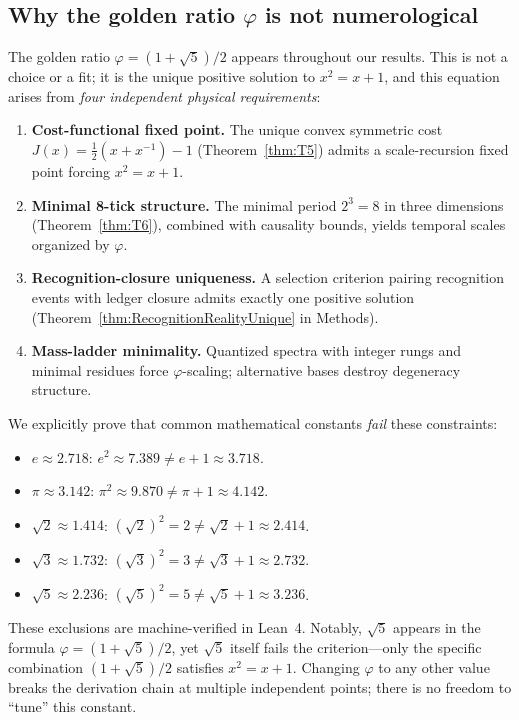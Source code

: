\documentclass[11pt]{article}
\begin{document}
\subsection*{Why the golden ratio $\varphi$ is not numerological}

The golden ratio $\varphi=(1+\sqrt{5})/2$ appears throughout our results. This is not a choice or a fit; it is the unique positive solution to $x^2=x+1$, and this equation arises from \emph{four independent physical requirements}:
\begin{enumerate}
\item \textbf{Cost-functional fixed point.} The unique convex symmetric cost $J(x)=\tfrac{1}{2}(x+x^{-1})-1$ (Theorem~\ref{thm:T5}) admits a scale-recursion fixed point forcing $x^2=x+1$.
\item \textbf{Minimal 8-tick structure.} The minimal period $2^3=8$ in three dimensions (Theorem~\ref{thm:T6}), combined with causality bounds, yields temporal scales organized by $\varphi$.
\item \textbf{Recognition-closure uniqueness.} A selection criterion pairing recognition events with ledger closure admits exactly one positive solution (Theorem~\ref{thm:RecognitionRealityUnique} in Methods).
\item \textbf{Mass-ladder minimality.} Quantized spectra with integer rungs and minimal residues force $\varphi$-scaling; alternative bases destroy degeneracy structure.
\end{enumerate}
We explicitly prove that common mathematical constants \emph{fail} these constraints:
\begin{itemize}
\item $e\approx 2.718$: $e^2\approx 7.389 \ne e+1\approx 3.718$.
\item $\pi\approx 3.142$: $\pi^2\approx 9.870 \ne \pi+1\approx 4.142$.
\item $\sqrt{2}\approx 1.414$: $(\sqrt{2})^2=2 \ne \sqrt{2}+1\approx 2.414$.
\item $\sqrt{3}\approx 1.732$: $(\sqrt{3})^2=3 \ne \sqrt{3}+1\approx 2.732$.
\item $\sqrt{5}\approx 2.236$: $(\sqrt{5})^2=5 \ne \sqrt{5}+1\approx 3.236$.
\end{itemize}
These exclusions are machine-verified in Lean~4. Notably, $\sqrt{5}$ appears in the formula $\varphi=(1+\sqrt{5})/2$, yet $\sqrt{5}$ itself fails the criterion---only the specific combination $(1+\sqrt{5})/2$ satisfies $x^2=x+1$. Changing $\varphi$ to any other value breaks the derivation chain at multiple independent points; there is no freedom to ``tune'' this constant.
\end{document}
